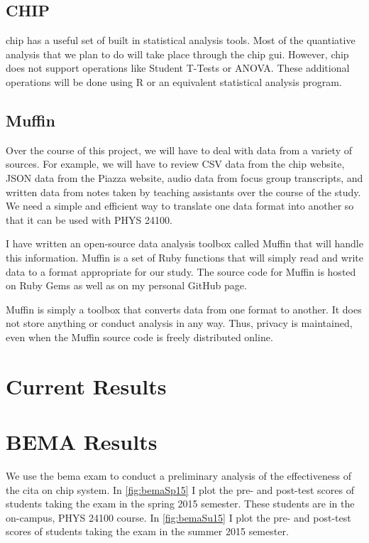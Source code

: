 \subsection{CHIP}

\gls{chip} has a useful set of built in statistical analysis tools. Most of the quantiative analysis that we plan to do will take place through the \gls{chip} \gls{gui}. However, \gls{chip} does not support operations like Student T-Tests or ANOVA. These additional operations will be done using R or an equivalent statistical analysis program.

\subsection{Muffin}

Over the course of this project, we will have to deal with data from a variety of sources. For example, we will have to review CSV data from the \gls{chip} website, JSON data from the Piazza website, audio data from focus group transcripts, and written data from notes taken by teaching assistants over the course of the study. We need a simple and efficient way to translate one data format into another so that it can be used with PHYS 24100.

I have written an open-source data analysis toolbox called Muffin that will handle this information. Muffin is a set of Ruby functions that will simply read and write data to a format appropriate for our study. The source code for Muffin is hosted on Ruby Gems as well as on my personal GitHub page.

Muffin is simply a toolbox that converts data from one format to another. It does not store anything or conduct analysis in any way. Thus, privacy is maintained, even when the Muffin source code is freely distributed online.

\section{Current Results}

\section{BEMA Results}

We use the \gls{bema} exam to conduct a preliminary analysis of the effectiveness of the \gls{cita} on \gls{chip} system. In \ref{fig:bemaSp15} I plot the pre- and post-test scores of students taking the exam in the spring 2015 semester. These students are in the on-campus, PHYS 24100 course. In \ref{fig:bemaSu15} I plot the pre- and post-test scores of students taking the exam in the summer 2015 semester.

